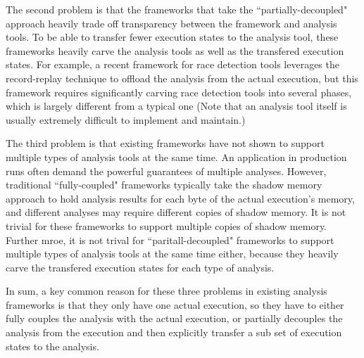 The second problem is that the frameworks that take the ``partially-decoupled" 
approach heavily trade off transparency between the framework and analysis 
tools. To be able to transfer fewer execution states to the analysis tool, 
these frameworks heavily carve the analysis tools as well as the transfered 
execution states. For example, a recent framework for race detection tools 
leverages the record-replay technique to offload the analysis from the actual 
execution, but this framework requires significantly carving race detection 
tools into several phases, which is largely different from a typical one (Note 
that an analysis tool itself is usually extremely difficult to implement and 
maintain.)


The third problem is that existing frameworks have not shown to support 
multiple types of analysis tools at the same time. An application in 
production runs often demand the powerful guarantees of multiple analyses. 
However, traditional ``fully-coupled" frameworks typically take the shadow 
memory approach to hold analysis results for each byte of the actual 
execution's memory, and different analyses may require different copies of 
shadow memory. It is not trivial for these frameworks to support multiple 
copies of shadow memory. Further mroe, it is not trival for 
``paritall-decoupled" frameworks to support multiple types of analysis tools at 
the same time either, because they heavily carve the transfered execution 
states for each type of analysis.


In sum, a key common reason for these three problems in existing analysis 
frameworks is that they only have one actual execution, so they have to either 
fully couples the analysis with the actual execution, or partially decouples 
the analysis from the execution and then explicitly transfer a sub set of 
execution states to the analysis.








